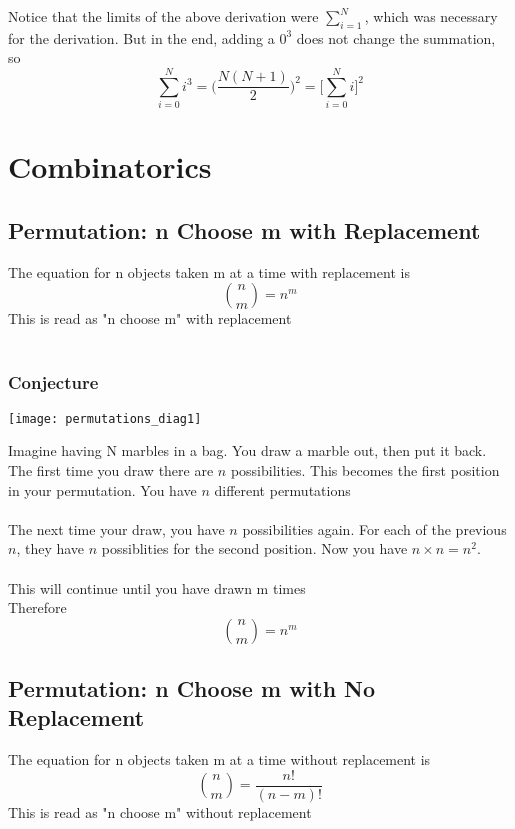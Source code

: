 \documentclass[11pt]{book}
\begin{document}
Notice that the limits of the above derivation were \( \sum\limits_{i=1}^N \), which was necessary for the derivation.  But in the end, adding a \(0^3\) does not change the summation, so
\[\sum\limits_{i=0}^N{i^3} = \bigg(\frac{N(N+1)}{2}\bigg)^2 = \bigg[ \sum\limits_{i=0}^N{i}\bigg]^2\]


\chapter{Combinatorics}

\section{ Permutation: n Choose m with Replacement}
The equation for n objects taken m at a time with replacement is
\[{n\choose m} = n^m\]
This is read as "n choose m" with replacement\\
\\
\subsection{Conjecture}
\begin{center}
\texttt{[image: permutations\_diag1]}
\end{center}
Imagine having N marbles in a bag.  You draw a marble out, then put it back.  The first time you draw there are \(n\) possibilities.  This becomes the first position in your permutation. You have \(n\) different permutations\\
\\
The next time your draw, you have \(n\) possibilities again.  For each of the previous \(n\), they have \(n\) possiblities for the second position.  Now you have \(n\times n = n^2\). \\
\\
This will continue until you have drawn m times
\\
Therefore
\[{n\choose m} = n^m\]


\section{ Permutation: n Choose m with No Replacement}
The equation for n objects taken m at a time without replacement is
\[{n\choose m} = \frac{n!}{(n-m)!}\]
This is read as "n choose m" without replacement\\
\\
\end{document}

